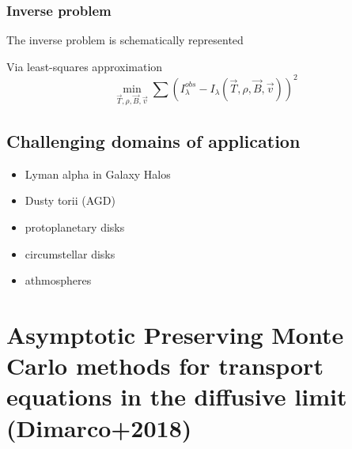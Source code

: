 \documentclass[../main/main.tex]{subfiles}
\begin{document}
\noindent{}

\subsubsection*{Inverse problem}
The inverse problem is schematically represented
\begin{center}
\end{center}
Via least-squares approximation
\begin{equation}
\min_{\vec{T},\rho,\vec{B},\vec{v}} \sum \left( I_{\lambda}^{obs} - I_\lambda(\vec{T},\rho,\vec{B},\vec{v}) \right)^2
\end{equation}

\subsection{Challenging domains of application}
\begin{itemize}
\item Lyman alpha in Galaxy Halos
\item Dusty torii (AGD)
\item protoplanetary disks
\item circumstellar disks
\item athmospheres
\end{itemize}

\newpage
\section{Asymptotic Preserving Monte Carlo methods for transport equations in the diffusive limit (Dimarco+2018)}
\end{document}
